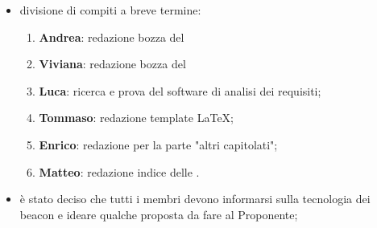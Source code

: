 \documentclass[a4paper,titlepage]{article}
\begin{document}
\begin{itemize}
  \item divisione di compiti a breve termine:
  \begin{enumerate} %
  	\item \textbf{Andrea}: redazione bozza del 
  	\item \textbf{Viviana}: redazione bozza del 
  	\item \textbf{Luca}: ricerca e prova del software di analisi dei requisiti;
  	\item \textbf{Tommaso}: redazione template \LaTeX;
  	\item \textbf{Enrico}: redazione  per la parte "altri capitolati";
  	\item \textbf{Matteo}: redazione indice delle .
  \end{enumerate}
  \item è stato deciso che tutti i membri devono informarsi sulla tecnologia dei beacon e ideare qualche proposta da fare al Proponente; %
\end{itemize}
\end{document}
